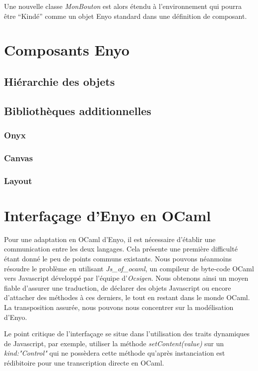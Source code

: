 \documentclass[11pt,a4paper]{report}
\begin{document}
Une nouvelle classe \emph{MonBouton} est alors étendu à l'environnement qui pourra être
``Kindé'' comme un objet Enyo standard dans une définition de composant.


\chapter{Composants Enyo}
\section{Hiérarchie des objets}
\section{Bibliothèques additionnelles}
\subsection{Onyx}
\subsection{Canvas}
\subsection{Layout}


\chapter{Interfaçage d'Enyo en OCaml}\label{chap:model}

Pour une adaptation en OCaml d'Enyo, il est nécessaire d'établir une communication
entre les deux langages. Cela présente une première difficulté étant donné le peu
de points communs existants. Nous pouvons néanmoins résoudre le problème en
utilisant  \emph{Js\_of\_ocaml}, un compileur de byte-code OCaml vers Javascript développé par 
l'équipe d'\emph{Ocsigen}. Nous obtenons ainsi un moyen fiable d'assurer une traduction, 
de déclarer des objets Javascript ou encore d'attacher des méthodes à ces derniers, le tout
en restant dans le monde OCaml. La transposition assurée, nous pouvons nous concentrer sur 
la modélisation d'Enyo.

Le point critique de l'interfaçage se situe dans l'utilisation des traits 
dynamiques de Javascript, par exemple, utiliser la méthode \emph{setContent(value)} sur un
\emph{kind:"Control"} qui ne possèdera cette méthode qu'après instanciation est
rédibitoire pour une transcription directe en OCaml.\medskip
\end{document}
